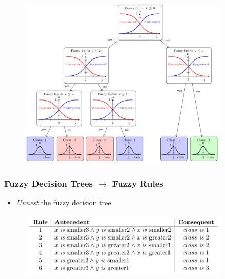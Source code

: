 \documentclass[
	10pt,
	t		%
]{beamer}
\begin{document}
\begin{frame}

	\begin{figure}
		\centering
		\includegraphics[width=0.9\textwidth]{figures/fuzzy-decision-tree.png}
	\end{figure}
	
\end{frame}

\begin{frame}

	\frametitle{Fuzzy Decision Trees $\rightarrow$ Fuzzy Rules}
	
	\begin{itemize}
		\item \textit{Unnest} the fuzzy decision tree
	\end{itemize}
	
	\begin{figure}
		\centering
		\includegraphics[width=0.9\textwidth]{figures/extracted-rules.png}
	\end{figure}
	
\end{frame}
\end{document}
